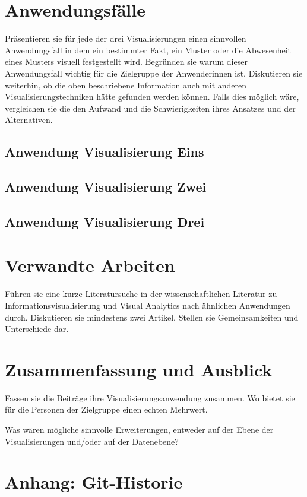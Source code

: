 \documentclass[usegeometry=true]{scrartcl}
\begin{document}
\section{Anwendungsfälle}
Präsentieren sie für jede der drei Visualisierungen einen sinnvollen Anwendungsfall 
in dem ein bestimmter Fakt, ein Muster oder die Abwesenheit eines Musters visuell festgestellt wird.
Begründen sie warum dieser Anwendungsfall wichtig für die Zielgruppe der Anwenderinnen ist.
Diskutieren sie weiterhin, ob die oben beschriebene Information auch mit anderen 
Visualisierungstechniken hätte gefunden werden können.
Falls dies möglich wäre, vergleichen sie die den Aufwand und die Schwierigkeiten ihres Ansatzes und der Alternativen. 
\subsection{Anwendung Visualisierung Eins}

\subsection{Anwendung Visualisierung Zwei}



\subsection{Anwendung Visualisierung Drei}

\section{Verwandte Arbeiten}
Führen sie eine kurze Literatursuche in der wissenschaftlichen Literatur zu Informationsvisualisierung und Visual Analytics nach ähnlichen Anwendungen durch. Diskutieren sie mindestens zwei Artikel. Stellen sie Gemeinsamkeiten und Unterschiede dar.

\section{Zusammenfassung und Ausblick}
Fassen sie die Beiträge ihre Visualisierungsanwendung zusammen. Wo bietet sie für die Personen der Zielgruppe einen echten Mehrwert.

Was wären mögliche sinnvolle Erweiterungen, entweder auf der Ebene der Visualisierungen und/oder auf der Datenebene?

\section*{Anhang: Git-Historie}

\printbibliography
\end{document}
